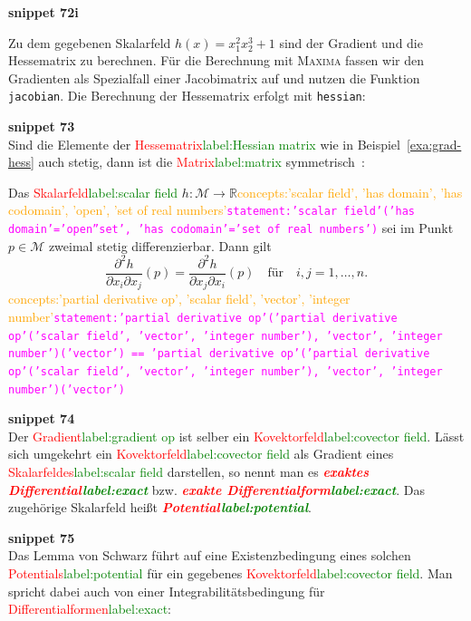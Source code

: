 \documentclass[a4paper,twoside,english,ngerman,deutsch,german,sectrefs,envcountsame,envcountchap]{svmono}
\newcommand{\setref}[2]{\textcolor{red}{#1}\textcolor{green}{#2}}
\newcommand{\snippet}[1]{\textbf{snippet #1}\\}
\newcommand{\eqnote}[2]{\textcolor{orange}{#1}\textcolor{magenta}{\texttt{#2}}}
\begin{document}
\snippet{72i}
\begin{example}
\label{exa:grad-hess}Zu dem gegebenen Skalarfeld $h(x)=x_{1}^{2}x_{2}^{3}+1$
sind der Gradient und die Hessematrix zu berechnen. Für die Berechnung
mit \textsc{Maxima} fassen wir den Gradienten als Spezialfall einer
Jacobimatrix auf und nutzen die Funktion \texttt{jacobian}. Die Berechnung
der Hessematrix erfolgt mit \texttt{hessian}:


\end{example}

\snippet{73}
Sind die Elemente der \setref{Hessematrix}{label:Hessian matrix} wie in Beispiel~\ref{exa:grad-hess}
auch stetig, dann ist die \setref{Matrix}{label:matrix} symmetrisch~\cite{koenigsberger2-2004}:

\begin{lemma}
\label{lem:Schwarz}Das
\setref{Skalarfeld}{label:scalar field} $h:\mathcal{M}\to{\mathbb{R}}$\eqnote{concepts:'scalar field', 'has domain', 'has codomain', 'open', 'set of real numbers'}{statement:'scalar field'('has domain'='open''set', 'has codomain'='set of real numbers')} sei im Punkt $p\in\mathcal{M}$ zweimal
stetig differenzierbar. Dann gilt
\begin{equation}
\frac{\partial^{2}h}{\partial x_{i}\partial x_{j}}(p)=\frac{\partial^{2}h}{\partial x_{j}\partial x_{i}}(p)\quad\textrm{für}\quad i,j=1,\ldots,n.\label{eq:lemma-schwarz}
\end{equation}\eqnote{concepts:'partial derivative op', 'scalar field', 'vector', 'integer number'}{statement:'partial derivative op'('partial derivative op'('scalar field', 'vector', 'integer number'), 'vector', 'integer number')('vector') == 'partial derivative op'('partial derivative op'('scalar field', 'vector', 'integer number'), 'vector', 'integer number')('vector')}
\end{lemma}

\snippet{74}
Der \setref{Gradient}{label:gradient op} ist selber ein \setref{Kovektorfeld}{label:covector field}. Lässt sich umgekehrt ein
\setref{Kovektorfeld}{label:covector field} als Gradient eines \setref{Skalarfeldes}{label:scalar field} darstellen, so nennt
man es \textbf{\em \setref{exaktes Differential}{label:exact}} bzw.
\textbf{\em \setref{exakte Differentialform}{label:exact}}. Das
zugehörige Skalarfeld heißt \textbf{\em \setref{Potential}{label:potential}}.

\snippet{75}
Das
Lemma von Schwarz führt auf eine Existenzbedingung eines solchen \setref{Potentials}{label:potential}
für ein gegebenes \setref{Kovektorfeld}{label:covector field}. Man spricht dabei auch von einer Integrabilitätsbedingung
für \setref{Differentialformen}{label:exact}:
\end{document}
